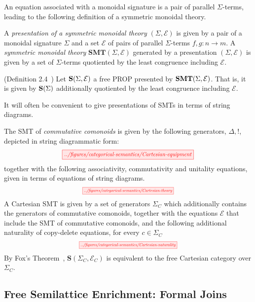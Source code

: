An equation associated with a monoidal signature is a pair of parallel $\Sigma$-terms, leading to the following definition of a symmetric monoidal theory. 
\begin{definition}
A \textit{presentation of a symmetric monoidal theory} $(\Sigma, \mathcal{E})$ is given by a pair of a monoidal signature $\Sigma$ and a set $\mathcal{E}$ of pairs of parallel $\Sigma$-terms $f,g: n \to m$.
A \textit{symmetric monoidal theory} $\textbf{SMT}(\Sigma,\mathcal{E})$ generated by a presentation $(\Sigma, \mathcal{E})$ is given by a set of $\Sigma$-terms quotiented by the least congruence including $\mathcal{E}$.
\end{definition}

\begin{definition}(Definition 2.4~\cite{bonchi_string_2022-1})
Let $\mathbf{S}(\Sigma, \mathcal{E})$ a free PROP presented by $\mathbf{SMT}(\Sigma, \mathcal{E})$.
That is, it is given by $\mathbf{S}(\Sigma)$ additionally quotiented by the least congruence including $\mathcal{E}$.
\end{definition}

It will often be convenient to give presentations of SMTs in terms of string diagrams.
\begin{example}
The SMT of \textit{commutative comonoids} is given by the following generators, ${\Delta, !}$, depicted in string diagrammatic form:
\[
	\scalebox{0.8}{
  	 \tikzfig{../figures/categorical-semantics/Cartesian-equipment}
	}
\]
together with the following associativity, commutativity and unitality equations, given in terms of equations of string diagrams. 
\[
	\scalebox{0.6}{
	\tikzfig{../figures/categorical-semantics/Cartesian-theory}	
	}
\]
A Cartesian SMT is given by a set of generators $\Sigma_C$ which additionally contains the generators of commutative comonoids, together with the equations $\mathcal{E}$ that include the SMT of commutative comonoids, and the following additional naturality of copy-delete equations, for every $c \in \Sigma_C$
\[
	\scalebox{0.6}{
	\tikzfig{../figures/categorical-semantics/Cartesian-naturality}
	}
\]
By Fox's Theorem~\cite{fox},  $\textbf{S}(\Sigma_C, \mathcal{E}_C)$ is equivalent to the free Cartesian category over $\Sigma_C$. 
\end{example}

\subsection{Free Semilattice Enrichment: Formal Joins}

